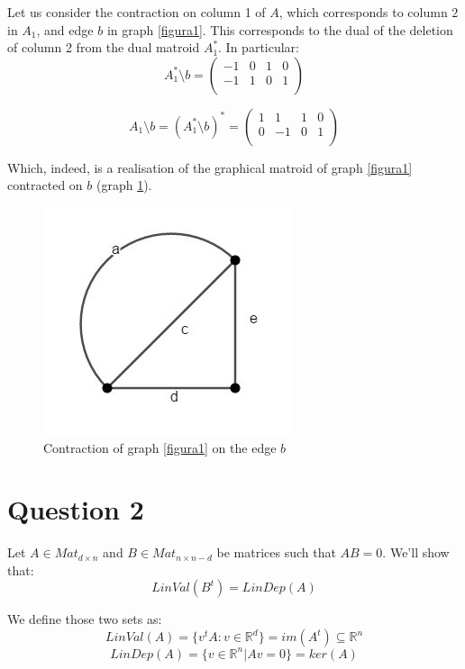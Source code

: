 \documentclass[12pt]{article}
\begin{document}
Let us consider the contraction on column 1 of $A$, which corresponds to column $2$ in $A_{1}$, and edge $b$ in graph \ref{figura1}. This corresponds to the dual of the deletion of column 2 from the dual matroid $A_{1}^{*}$. In particular: $$A_{1}^{*} \setminus b = \left( {\begin{array}{cccc}
   -1 & 0 & 1 & 0\\
   -1 & 1 & 0 & 1\\
  \end{array} } \right)$$
  
$$A_{1} \setminus b = (A_{1}^{*} \setminus b)^{*} = \left( {\begin{array}{ccccc}
   1 & 1 & 1 & 0\\
   0 & -1 & 0 & 1\\
  \end{array} } \right)$$
  
Which, indeed, is a realisation of the graphical matroid of graph \ref{figura1} contracted on $b$ (graph \ref{figura3}).

\begin{figure}
    \centering
    \includegraphics{figures/figura3.JPG}
    \caption{Contraction of graph \ref{figura1} on the edge $b$}
    \label{figura3}
\end{figure}

\section{Question 2}

Let $A \in Mat_{d \times n}$ and $B \in Mat_{n \times n-d}$ be matrices such that $AB = 0$. We'll show that: $$LinVal(B^{t}) = LinDep(A)$$

We define those two sets as: $$LinVal(A) = \lbrace v^{t}A : v \in \mathbb{R}^{d} \rbrace = im(A^{t}) \subseteq \mathbb{R}^{n}$$ $$LinDep(A) = \lbrace v \in \mathbb{R}^{n} | Av = 0 \rbrace = ker(A)$$
\end{document}
